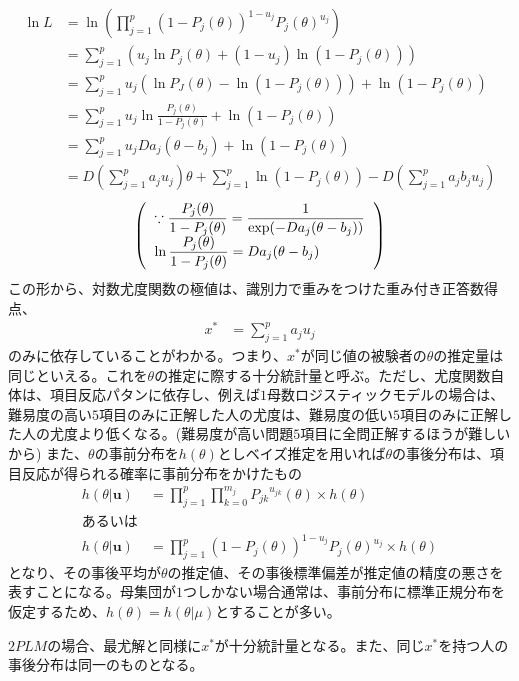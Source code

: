\documentclass[12pt]{jarticle}
\begin{document}
\begin{align*}
  \label{05}
  \displaystyle \ln L &= \ln \left(\prod_{j = 1}^{p} (1 - P_j(\theta))^{1 - u_j}P_j(\theta)^{u_j}\right)\\
  &= \sum_{j = 1}^{p} \left(u_j\ln P_j(\theta) + (1 - u_j)\ln(1 - P_j(\theta)) \right) \\
  &= \sum_{j = 1}^{p}  u_j(\ln P_J(\theta)- \ln (1 - P_j(\theta))) + \ln (1 - P_j(\theta)) \\
  &= \sum_{j = 1}^{p} u_j \ln \frac{P_j(\theta)}{1 - P_j(\theta)} + \ln(1-P_j(\theta)) \\
  &= \sum_{j = 1}^{p} u_j  Da_j(\theta - b_j) + \ln(1-P_j(\theta)) \\
  &= D(\sum_{j = 1}^{p}a_ju_j)\theta  + \sum_{j = 1}^{p} \ln (1 - P_j(\theta)) - D(\sum_{j = 1}^{p} a_jb_ju_j) \tag{7}
\end{align*}
\[
  \left(
  \begin{tabular}{l}
    $\displaystyle\because \frac{P_j(\theta)}{1 - P_j(\theta)} = \frac{1}{\exp(-D a_j (\theta - b_j))}$  \\  $\displaystyle\ln \frac{P_j(\theta)}{1 - P_j(\theta)} = Da_j(\theta - b_j)$
  \end{tabular}
  \right)
\]
この形から、対数尤度関数の極値は、識別力で重みをつけた重み付き正答数得点、
\begin{align}
  \label{06}
  \displaystyle x^{\ast} &= \sum_{j = 1}^{p} a_j  u_j \tag{8}
\end{align}
のみに依存していることがわかる。つまり、$x^{\ast}$が同じ値の被験者の$\theta$の推定量は同じといえる。これを$\theta$の推定に際する十分統計量と呼ぶ。ただし、尤度関数自体は、項目反応パタンに依存し、例えば$1$母数ロジスティックモデルの場合は、難易度の高い$5$項目のみに正解した人の尤度は、難易度の低い$5$項目のみに正解した人の尤度より低くなる。(難易度が高い問題$5$項目に全問正解するほうが難しいから)
また、$\theta$の事前分布を$h(\theta)$としベイズ推定を用いれば$\theta$の事後分布は、項目反応が得られる確率に事前分布をかけたもの
\begin{align*}
  \label{07}
  \displaystyle h(\theta|\boldsymbol{u})&=\prod_{j = 1}^{p} \prod_{k = 0}^{m_j} {P_{jk}}^{u_{jk}}(\theta)\times h(\theta)\\
  あるいは\\
  h(\theta|\boldsymbol{u}) &= \prod_{j = 1}^{p} (1 - P_j(\theta))^{1 - u_j}P_j(\theta)^{u_j} \times h(\theta) \tag{9}
\end{align*}
となり、その事後平均が$\theta$の推定値、その事後標準偏差が推定値の精度の悪さを表すことになる。母集団が$1$つしかない場合通常は、事前分布に標準正規分布を仮定するため、$h(\theta) = h(\theta|\mu)$とすることが多い。

$2PLM$の場合、最尤解と同様に$x^{\ast}$が十分統計量となる。また、同じ$x^{\ast}$を持つ人の事後分布は同一のものとなる。
\end{document}
